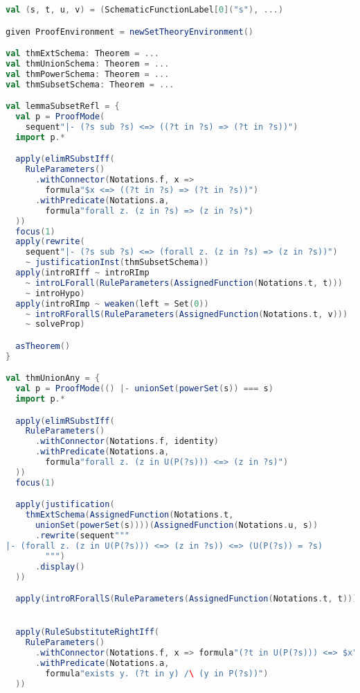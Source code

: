 \newpage
\begin{lstlisting}[language=Scala,basicstyle=\fontsize{9.5pt}{9.5pt}\selectfont,caption={[Sample proof (front)]{Example of a proof written in the front showing that $\vdash \mathcal{U}(\mathcal{P}({?s})) = {?s}$. The generated kernel proof is presented in \autoref{fig:lisa-proof-sample}.}},label={fig:scala-proof-sample},captionpos=b]
val (s, t, u, v) = (SchematicFunctionLabel[0]("s"), ...)

given ProofEnvironment = newSetTheoryEnvironment()

val thmExtSchema: Theorem = ...
val thmUnionSchema: Theorem = ...
val thmPowerSchema: Theorem = ...
val thmSubsetSchema: Theorem = ...

val lemmaSubsetRefl = {
  val p = ProofMode(
    sequent"|- (?s sub ?s) <=> ((?t in ?s) => (?t in ?s))")
  import p.*

  apply(elimRSubstIff(
    RuleParameters()
      .withConnector(Notations.f, x =>
        formula"$x <=> ((?t in ?s) => (?t in ?s))")
      .withPredicate(Notations.a,
        formula"forall z. (z in ?s) => (z in ?s)")
  ))
  focus(1)
  apply(rewrite(
    sequent"|- (?s sub ?s) <=> (forall z. (z in ?s) => (z in ?s))")
    ~ justificationInst(thmSubsetSchema))
  apply(introRIff ~ introRImp
    ~ introLForall(RuleParameters(AssignedFunction(Notations.t, t)))
    ~ introHypo)
  apply(introRImp ~ weaken(left = Set(0))
    ~ introRForallS(RuleParameters(AssignedFunction(Notations.t, v)))
    ~ solveProp)

  asTheorem()
}

val thmUnionAny = {
  val p = ProofMode(() |- unionSet(powerSet(s)) === s)
  import p.*

  apply(elimRSubstIff(
    RuleParameters()
      .withConnector(Notations.f, identity)
      .withPredicate(Notations.a,
        formula"forall z. (z in U(P(?s))) <=> (z in ?s)")
  ))
  focus(1)

  apply(justification(
    thmExtSchema(AssignedFunction(Notations.t,
      unionSet(powerSet(s))))(AssignedFunction(Notations.u, s))
      .rewrite(sequent"""
|- (forall z. (z in U(P(?s))) <=> (z in ?s)) <=> (U(P(?s)) = ?s)
        """)
      .display()
  ))

  apply(introRForallS(RuleParameters(AssignedFunction(Notations.t, t))))


  apply(RuleSubstituteRightIff(
    RuleParameters()
      .withConnector(Notations.f, x => formula"(?t in U(P(?s))) <=> $x")
      .withPredicate(Notations.a,
        formula"exists y. (?t in y) /\ (y in P(?s))")
  ))


\end{lstlisting}
